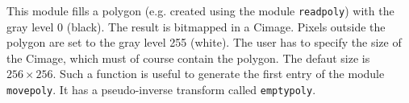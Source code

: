This module fills a polygon (e.g. created using the
module \verb+readpoly+) with the gray level 0 (black).
The result is bitmapped in a Cimage.
Pixels outside the polygon are set to the gray level 255 (white).
The user has to specify the size of the Cimage, which must of course contain 
the polygon. The defaut size is $256 \times 256$.
Such a function is useful to generate the first entry of the 
module \verb+movepoly+.
It has a pseudo-inverse transform called \verb+emptypoly+.

